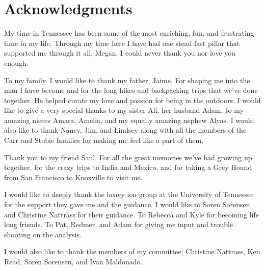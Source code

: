 \chapter*{Acknowledgments}\label{ch:acknowledgments}
My time in Tennessee has been some of the most enriching, fun, and frustrating time in my life.  Through my time here I have had one stead fast pillar that supported me through it all, Megan.  I could never thank you nor love you enough.

\par
To my family. I would like to thank my father, Jaime.  For shaping me into the man I have become and for the long hikes and backpacking trips that we've done together.  He helped curate my love and passion for being in the outdoors.  I would like to give a very special thanks to my sister Ali, her husband Adam, to my amazing nieces Amara, Amelia, and my equally amazing nephew Alyas.  I would also like to thank Nancy, Jim, and Lindsey along with all the members of the Carr and Stobie families for making me feel like a part of them.  

\par
Thank you to my friend Saul.  For all the great memories we've had growing up together, for the crazy trips to India and Mexico, and for taking a Grey Hound from San Francisco to Knoxville to visit me.  

\par
I would like to deeply thank the heavy ion group at the University of Tennessee for the support they gave me and the guidance.  I would like to Soren Sorensen and Christine Nattrass for their guidance.  To Rebecca and Kyle for becoming life long friends.  To Pat, Redmer, and Adam for giving me input and trouble shooting on the analysis.

\par 
I would also like to thank the members of my committee; Christine Nattrass, Ken Read, Soren Sorensen, and Ivan Maldonado. 

